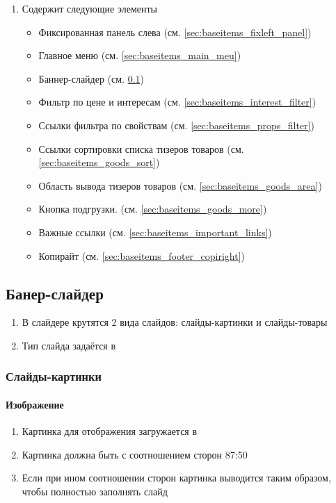         \begin{enumerate}
            \item
            Содержит следующие элементы
            \begin{itemize}
                \item Фиксированная панель слева (см. \ref{sec:baseitems_fixleft_panel})
                \item Главное меню (см. \ref{sec:baseitems_main_meu})
                \item Баннер-слайдер (см. \ref{sec:slider})
                \item Фильтр по цене и интересам (см. \ref{sec:baseitems_interest_filter})
                \item Ссылки фильтра по свойствам (см. \ref{sec:baseitems_props_filter})
                \item Ссылки сортировки списка тизеров товаров (см. \ref{sec:baseitems_goods_sort})
                \item Область вывода тизеров товаров (см. \ref{sec:baseitems_goods_area})
                \item Кнопка подгрузки.  (см. \ref{sec:baseitems_goods_more})
                \item Важные ссылки (см. \ref{sec:baseitems_important_links})
                \item Копирайт (см. \ref{sec:baseitems_footer_copiright})
            \end{itemize}
        \end{enumerate}
    
        \subsection{Банер-слайдер}
            \label{sec:slider}
            
            \begin{enumerate}
                \item В слайдере крутятся 2 вида слайдов: слайды-картинки и слайды-товары
                \item Тип слайда задаётся в 
            \end{enumerate}
            
            \subsubsection{Слайды-картинки}
                \paragraph{Изображение}
                    \begin{enumerate}
                        \item Картинка для отображения загружается в 
                        \item Картинка должна быть с соотношением сторон 87:50
                        \item Если при ином соотношении сторон картинка выводится таким образом, чтобы полностью заполнять слайд
                    \end{enumerate}
                
